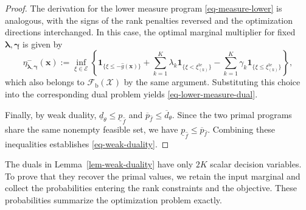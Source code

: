 \documentclass[review,11pt,3p,authoryear,nopreprintline]{elsarticle}
\begin{document}
\begin{proof}
  The derivation for the lower measure program \eqref{eq-measure-lower} is analogous, with the signs of the rank penalties reversed and the optimization directions interchanged. In this case, the optimal marginal multiplier for fixed $\bm\lambda,\bm\gamma$ is given by
  \begin{equation}
    \eta^-_{\bm\lambda,\bm\gamma}(\bm x)
    :=\inf_{\xi\in\mathcal E}\left\{
      \mathbf1_{\{\xi\le-\hat g(\bm x)\}}
      +\sum_{k=1}^K\lambda_k\mathbf1_{\{\xi<\xi_{(k)}^{\mathrm{te}}\}}
      -\sum_{k=1}^K\gamma_k\mathbf1_{\{\xi\le\xi_{(k)}^{\mathrm{te}}\}}
    \right\},
    \label{eq-lower-marginal-envelope}
  \end{equation}
  which also belongs to $\mathcal F_{\mathrm b}(\mathcal X)$ by the same argument. Substituting this choice into the corresponding dual problem yields \eqref{eq-lower-measure-dual}.

  Finally, by weak duality, $\underline d_\theta\le\underline p_{\hat f}$ and $\overline p_{\hat f}\le\overline d_\theta$. Since the two primal programs share the same nonempty feasible set, we have $\underline p_{\hat f}\le\overline p_{\hat f}$. Combining these inequalities establishes \eqref{eq-weak-duality}.
\end{proof}

The duals in Lemma~\ref{lem-weak-duality} have only $2K$ scalar decision variables. To prove that they recover the primal values, we retain the input marginal and collect the probabilities entering the rank constraints and the objective. These probabilities summarize the optimization problem exactly.
\end{document}
